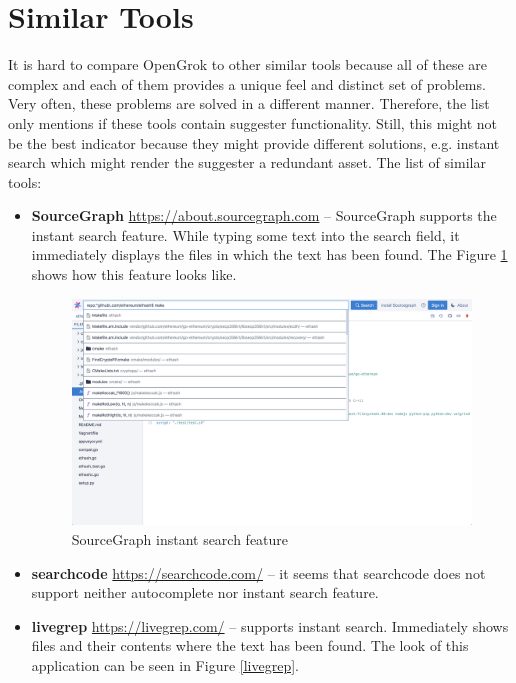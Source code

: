 \section{Similar Tools}
It is hard to compare OpenGrok to other similar tools because all of these are complex and each of them provides a unique
feel and distinct set of problems. Very often, these problems are solved in a different manner.
Therefore, the list only mentions if these tools contain suggester functionality. Still, this might not be the best
indicator because they might provide different solutions, e.g. instant search which might render the suggester a redundant asset.
The list of similar tools:
\begin{itemize}
    \item \textbf{SourceGraph} \url{https://about.sourcegraph.com} – SourceGraph supports the instant search feature.
    While typing some text into the search field, it immediately displays the files in which the text has been found. The Figure
    \ref{sourcegraph} shows how this feature looks like.

    \begin{figure}[htbp]
        \centering
        \includegraphics[width=145mm]{../img/sourcegraph.png}
        \caption{SourceGraph instant search feature}
        \label{sourcegraph}
    \end{figure}

    \item \textbf{searchcode} \url{https://searchcode.com/} – it seems that searchcode does not support neither
    autocomplete nor instant search feature.

    \item \textbf{livegrep} \url{https://livegrep.com/} – supports instant search. Immediately shows files and their contents
    where the text has been found. The look of this application can be seen in Figure \ref{livegrep}.


\end{itemize}
